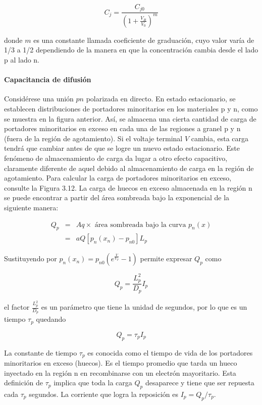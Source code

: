 \begin{equation*}
C_j = \frac{C_{j0}}{\left( 1 + \frac{V_R}{V_0} \right)^m}
\end{equation*}

donde \( m \) es una constante llamada coeficiente de graduación, cuyo valor varía de 1/3 a 1/2 dependiendo de la manera en que la concentración cambia desde el lado p al lado n.

\paragraph*{Capacitancia de difusión}

Considérese una unión $pn$ polarizada en directo. En estado estacionario, se establecen distribuciones de portadores minoritarios en los materiales p y n, como se muestra en la figura anterior. Así, se almacena una cierta cantidad de carga de portadores minoritarios en exceso en cada una de las regiones a granel p y n (fuera de la región de agotamiento). Si el voltaje terminal \( V \) cambia, esta carga tendrá que cambiar antes de que se logre un nuevo estado estacionario. Este fenómeno de almacenamiento de carga da lugar a otro efecto capacitivo, claramente diferente de aquel debido al almacenamiento de carga en la región de agotamiento.
Para calcular la carga de portadores minoritarios en exceso, consulte la Figura 3.12. La carga de huecos en exceso almacenada en la región n se puede encontrar a partir del área sombreada bajo la exponencial de la siguiente manera:

\begin{eqnarray*}
Q_p &=& A q \times \text{ área sombreada bajo la curva } p_n(x) \\
&=& a Q \left[ p_n(x_n) - p_{n0} \right] L_p
\end{eqnarray*}

Sustituyendo por $p_n(x_n) = p_{n0} \left( e ^{\frac{V}{V_T}} - 1 \right)$ permite expresar $Q_p$ como

\begin{equation*}
Q_p = \frac{L_p^2}{D_p} I_p
\end{equation*}

el factor $\frac{L_p^2}{D_p}$ es un parámetro que tiene la unidad de segundos, por lo que es un tiempo $\tau_p$ quedando 

\begin{equation*}
Q_p = \tau_p I_p
\end{equation*}

La constante de tiempo \(\tau_p\) es conocida como el tiempo de vida de los portadores minoritarios en exceso (huecos). Es el tiempo promedio que tarda un hueco inyectado en la región n en recombinarse con un electrón mayoritario. Esta definición de \(\tau_p\) implica que toda la carga \(Q_p\) desaparece y tiene que ser repuesta cada \(\tau_p\) segundos. La corriente que logra la reposición es \(I_p = Q_p/\tau_p\). \\

